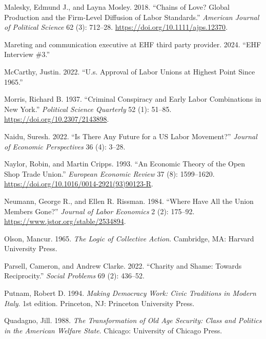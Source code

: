 \documentclass[
  11pt,
  oneside]{article}
\newlength{\cslhangindent}
\newenvironment{CSLReferences}[2] %
 {\begin{list}{}{%
  \setlength{\itemindent}{0pt}
  \setlength{\leftmargin}{0pt}
  \setlength{\parsep}{0pt}
  \ifodd #1
   \setlength{\leftmargin}{\cslhangindent}
   \setlength{\itemindent}{-1\cslhangindent}
  \fi
  \setlength{\itemsep}{#2\baselineskip}}}
 {\end{list}}
\begin{document}
\begin{CSLReferences}{1}{0}
Malesky, Edmund J., and Layna Mosley. 2018. {``Chains of {Love}? {Global} {Production} and the {Firm}-{Level} {Diffusion} of {Labor} {Standards}.''} \emph{American Journal of Political Science} 62 (3): 712--28. \url{https://doi.org/10.1111/ajps.12370}.

Mareting and communication executive at EHF third party provider. 2024. {``{EHF} Interview \#3.''}

McCarthy, Justin. 2022. {``U.s. Approval of Labor Unions at Highest Point Since 1965.''}

Morris, Richard B. 1937. {``Criminal {Conspiracy} and {Early Labor Combinations} in {New York}.''} \emph{Political Science Quarterly} 52 (1): 51--85. \url{https://doi.org/10.2307/2143898}.

Naidu, Suresh. 2022. {``Is There Any Future for a {US} {Labor} {Movement}?''} \emph{Journal of Economic Perspectives} 36 (4): 3--28.

Naylor, Robin, and Martin Cripps. 1993. {``An Economic Theory of the Open Shop Trade Union.''} \emph{European Economic Review} 37 (8): 1599--1620. \url{https://doi.org/10.1016/0014-2921(93)90123-R}.

Neumann, George R., and Ellen R. Rissman. 1984. {``Where {Have All} the {Union Members Gone}?''} \emph{Journal of Labor Economics} 2 (2): 175--92. \url{https://www.jstor.org/stable/2534894}.

Olson, Mancur. 1965. \emph{The {Logic} of {Collective} {Action}}. Cambridge, MA: Harvard University Press.

Parsell, Cameron, and Andrew Clarke. 2022. {``Charity and Shame: Towards Reciprocity.''} \emph{Social Problems} 69 (2): 436--52.

Putnam, Robert D. 1994. \emph{Making {Democracy} {Work}: {Civic} {Traditions} in {Modern} {Italy}}. 1st edition. Princeton, NJ: Princeton University Press.

Quadagno, Jill. 1988. \emph{The {Transformation} of {Old} {Age} {Security}: {Class} and {Politics} in the {American} {Welfare} {State}}. Chicago: University of Chicago Press.


\end{CSLReferences}
\end{document}
